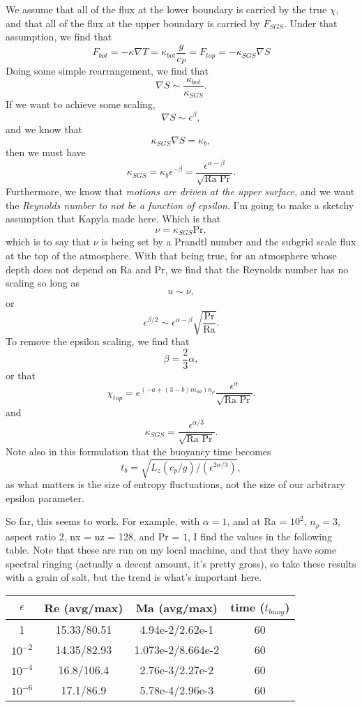\documentclass[aps, pre, onecolumn, nofootinbib, notitlepage, groupedaddress, amsfonts, amssymb, amsmath, longbibliography]{revtex4-1}
\newcommand{\grad}{\ensuremath{\nabla}}
\begin{document}
We assume that all of the flux at the lower boundary is carried by the true $\chi$,
and that all of the flux at the upper boundary is carried by $F_{SGS}$.  Under that
assumption, we find that 
$$
F_{bot} = -\kappa\grad T = \kappa_{bot}\frac{g}{c_P} =
F_{top} = -\kappa_{SGS} \grad S
$$
Doing some simple rearrangement, we find that
$$
\grad S \sim \frac{\kappa_{bot}}{\kappa_{SGS}}.
$$
If we want to achieve some scaling,
$$
\grad S \sim \epsilon^{\beta},
$$
and we know that
$$
\kappa_{SGS} \grad S = \kappa_b,
$$
then we must have 
$$
\kappa_{SGS} = \kappa_b \epsilon^{-\beta} = 
\frac{\epsilon^{\alpha-\beta}}{\sqrt{\text{Ra Pr}}}.
$$
Furthermore, we know that \emph{motions are driven at the upper surface}, and we
want the \emph{Reynolds number to not be a function of epsilon}. I'm going to make
a sketchy assumption that Kapyla made here.  Which is that
$$
\nu = \kappa_{SGS} \text{Pr},
$$
which is to say that $\nu$ is being set by a Prandtl number and the subgrid scale
flux at the top of the atmosphere.  With that being true, for an atmosphere whose
depth does not depend on Ra and Pr, we find that the Reynolds number has no scaling
so long as
$$
u \sim \nu,
$$
or
$$
\epsilon^{\beta/2} \sim \epsilon^{\alpha - \beta}\sqrt{\frac{\text{Pr}}{\text{Ra}}}.
$$
To remove the epsilon scaling, we find that
$$
\beta = \frac{2}{3}\alpha,
$$
or that
$$
\chi_{top} = e^{(-a + (3-b)m_{ad})n_{\rho}}\frac{\epsilon^{\alpha}}{\sqrt{\text{Ra Pr}}}.
$$
and
$$
\kappa_{SGS} = \frac{\epsilon^{\alpha/3}}{\sqrt{\text{Ra Pr}}}.
$$
Note also in this formulation that the buoyancy time becomes
$$
t_b = \sqrt{ L_z (c_p / g) / (\epsilon^{2\alpha/3})}, 
$$
as what matters is the size of entropy fluctuations, not the size of our
arbitrary epsilon parameter.

So far, this seems to work. For example, with $\alpha = 1$, and at Ra = $10^2$,
$n_\rho = 3$, aspect ratio 2, nx = nz = 128, and Pr = $1$, I find the values
in the following table. Note that these are run on my local machine, and that they
have some spectral ringing (actually a decent amount, it's pretty gross), 
so take these results with a grain of salt, but the
trend is what's important here.


\begin{center}
 \begin{tabular}{||c c c c||} 
 \hline
 $\epsilon$ & Re (avg/max) & Ma (avg/max) & time ($t_{buoy}$) \\ [0.5ex] 
 \hline\hline
 1 & 15.33/80.51 & 4.94e-2/2.62e-1 & 60 \\ 
 \hline
 $10^{-2}$ & 14.35/82.93 & 1.073e-2/8.664e-2 & 60 \\
 \hline
 $10^{-4}$ & 16.8/106.4 & 2.76e-3/2.27e-2 & 60 \\
 \hline
 $10^{-6}$ & 17.1/86.9 & 5.78e-4/2.96e-3 & 60 \\
 \hline
\end{tabular}
\end{center}
\end{document}

